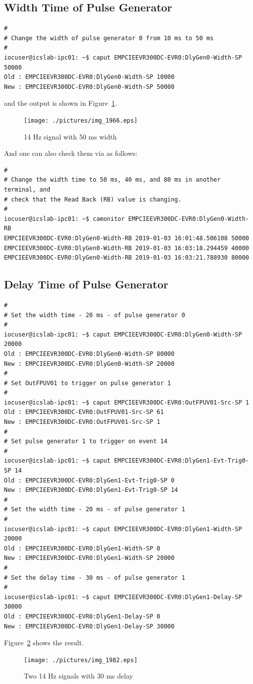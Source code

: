 \documentclass[11pt
  , a4paper
  , article
  , oneside
  , showtrims
]{memoir}
\begin{document}
{\subsection{Width Time of Pulse Generator}
\begin{lstlisting}[style=termstyle]
#
# Change the width of pulse generator 0 from 10 ms to 50 ms
#
iocuser@icslab-ipc01: ~$ caput EMPCIEEVR300DC-EVR0:DlyGen0-Width-SP 50000
Old : EMPCIEEVR300DC-EVR0:DlyGen0-Width-SP 10000
New : EMPCIEEVR300DC-EVR0:DlyGen0-Width-SP 50000
\end{lstlisting}
and the output is shown in Figure~\ref{fig:50ms}.
\begin{figure}[!ht]
  \centering
    \texttt{[image: ./pictures/img\_1966.eps]}
  \caption{14 Hz signal with 50 ms width}
  \label{fig:50ms}
\end{figure}

And one can also check them via  as follows:
\begin{lstlisting}[style=termstyle]
#
# Change the width time to 50 ms, 40 ms, and 80 ms in another terminal, and
# check that the Read Back (RB) value is changing.
#
iocuser@icslab-ipc01: ~$ camonitor EMPCIEEVR300DC-EVR0:DlyGen0-Width-RB
EMPCIEEVR300DC-EVR0:DlyGen0-Width-RB 2019-01-03 16:01:48.506108 50000
EMPCIEEVR300DC-EVR0:DlyGen0-Width-RB 2019-01-03 16:03:18.294459 40000
EMPCIEEVR300DC-EVR0:DlyGen0-Width-RB 2019-01-03 16:03:21.788930 80000
\end{lstlisting}

\subsection{Delay Time of Pulse Generator}
\begin{lstlisting}[style=termstyle]
#
# Set the width time - 20 ms - of pulse generator 0
#
iocuser@icslab-ipc01: ~$ caput EMPCIEEVR300DC-EVR0:DlyGen0-Width-SP 20000
Old : EMPCIEEVR300DC-EVR0:DlyGen0-Width-SP 80000
New : EMPCIEEVR300DC-EVR0:DlyGen0-Width-SP 20000
#
# Set OutFPUV01 to trigger on pulse generator 1
#
iocuser@icslab-ipc01: ~$ caput EMPCIEEVR300DC-EVR0:OutFPUV01-Src-SP 1
Old : EMPCIEEVR300DC-EVR0:OutFPUV01-Src-SP 61
New : EMPCIEEVR300DC-EVR0:OutFPUV01-Src-SP 1
#
# Set pulse generator 1 to trigger on event 14
#
iocuser@icslab-ipc01: ~$ caput EMPCIEEVR300DC-EVR0:DlyGen1-Evt-Trig0-SP 14
Old : EMPCIEEVR300DC-EVR0:DlyGen1-Evt-Trig0-SP 0
New : EMPCIEEVR300DC-EVR0:DlyGen1-Evt-Trig0-SP 14
#
# Set the width time - 20 ms - of pulse generator 1
#
iocuser@icslab-ipc01: ~$ caput EMPCIEEVR300DC-EVR0:DlyGen1-Width-SP 20000
Old : EMPCIEEVR300DC-EVR0:DlyGen1-Width-SP 0
New : EMPCIEEVR300DC-EVR0:DlyGen1-Width-SP 20000
#
# Set the delay time - 30 ms - of pulse generator 1
#
iocuser@icslab-ipc01: ~$ caput EMPCIEEVR300DC-EVR0:DlyGen1-Delay-SP 30000
Old : EMPCIEEVR300DC-EVR0:DlyGen1-Delay-SP 0
New : EMPCIEEVR300DC-EVR0:DlyGen1-Delay-SP 30000
\end{lstlisting}
Figure~\ref{fig:delay} shows the result.
\begin{figure}[!htb]
  \centering
    \texttt{[image: ./pictures/img\_1982.eps]}
  \caption{Two 14 Hz signals with 30 ms delay}
  \label{fig:delay}
\end{figure}

}
\end{document}
